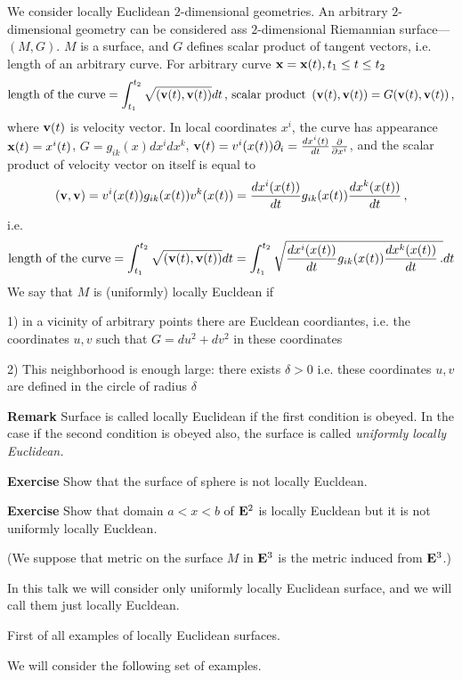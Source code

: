   We consider locally Euclidean $2$-dimensional 
geometries.  An arbitrary $2$-dimensional  geometry 
can be considered ass
$2$-dimensional  Riemannian surface---$(M,G)$.
$M$ is a surface, and $G$ defines scalar product of
tangent vectors, i.e. length of an arbitrary curve.
For arbitrary curve
  ${\bf x}={\bf x}(t), t_1\leq t\leq t_2$
             $$
 \hbox {length of the curve}=
   \int_{t_1}^{t_2} \sqrt{\left({\bf v}(t),{\bf v}(t)\right)}dt\,,\,
\hbox{scalar product}\,\,  
\left({\bf v}(t),{\bf v}(t)\right)=G({\bf v}(t),{\bf v}(t))\,, 
             $$
where ${\bf v}(t)$ is velocity vector. 
 In local coordinates $x^i$,
the curve has appearance  ${\bf x}(t)=x^i(t)$,
    $G=g_{ik}(x)dx^idx^k$,
  ${\bf v}(t)=v^i(x(t))\partial_i={dx^i(t)\over dt}{\partial\over \partial x^i}$,
and 
the scalar product of velocity vector on itself 
is equal to
      $$
\left({\bf v},{\bf v}\right)=
 v^i(x(t))g_{ik}(x(t))v^k(x(t))=
 {d x^i(x(t))\over dt}
   g_{ik}(x(t))
 {d x^k(x(t))\over dt}\,,
      $$
i.e.
      $$
 \hbox {length of the curve}=
   \int_{t_1}^{t_2} \sqrt{\left({\bf v}(t),{\bf v}(t)\right)}dt
      =
    \int_{t_1}^{t_2} \sqrt{
  {d x^i(x(t))\over dt}
   g_{ik}(x(t))
 {d x^k(x(t))\over dt} \,.   
             }dt
      $$
We say that $M$ is (uniformly) locally Eucldean
if

1) in a vicinity of arbitrary points there are 
 Eucldean coordiantes, i.e. the coordinates  $u,v$
such that  $G=du^2+dv^2$ in these coordinates


2) This  neighborhood is enough large:
there exists $\delta>0$
   i.e. these coordinates $u,v$ are defined in
the circle of radius $\delta$


{\bf Remark} 
  Surface is called locally Euclidean if the first condition
is obeyed. In the case if the second condition is
obeyed also, 
the surface is called {\it uniformly locally  Euclidean.}


\medskip

{\bf Exercise}  Show that the surface of sphere
is not locally Eucldean.


{\bf Exercise}  Show that domain $a<x<b$ of ${\bf E}^2$
is locally Eucldean but it is not uniformly 
locally Eucldean.

(We suppose that metric on the surface
$M$ in ${\bf E}^3$
is  the metric induced from ${\bf E}^3$.)

In this talk we will consider only uniformly locally 
Euclidean surface, and we will call them just
locally Eucldean.

\m
   First of all examples of locally Euclidean surfaces.

   We will consider the following set of examples.


